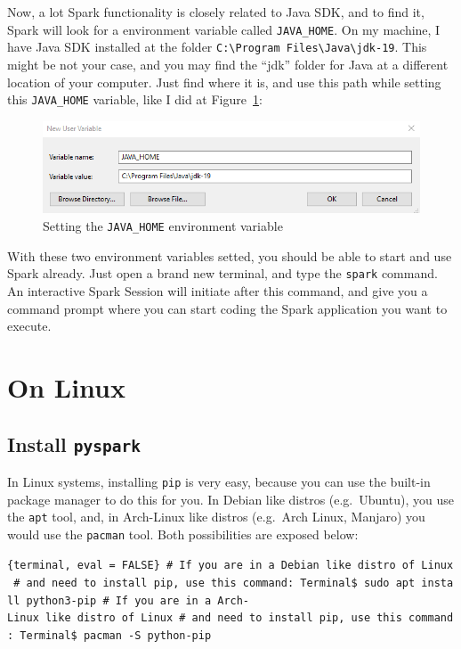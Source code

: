 \documentclass[
  11pt,
  letterpaper,
  DIV=11,
  numbers=noendperiod]{scrreprt}
\begin{document}
Now, a lot Spark functionality is closely related to Java SDK, and to
find it, Spark will look for a environment variable called
\texttt{JAVA\_HOME}. On my machine, I have Java SDK installed at the
folder
\texttt{C:\textbackslash{}Program\ Files\textbackslash{}Java\textbackslash{}jdk-19}.
This might be not your case, and you may find the ``jdk'' folder for
Java at a different location of your computer. Just find where it is,
and use this path while setting this \texttt{JAVA\_HOME} variable, like
I did at Figure~\ref{fig-java-home-env}:

\begin{figure}

{\centering \includegraphics{Chapters/../Figures/windows-environment-variables5.png}

}

\caption{\label{fig-java-home-env}Setting the \texttt{JAVA\_HOME}
environment variable}

\end{figure}

With these two environment variables setted, you should be able to start
and use Spark already. Just open a brand new terminal, and type the
\texttt{spark} command. An interactive Spark Session will initiate after
this command, and give you a command prompt where you can start coding
the Spark application you want to execute.

\hypertarget{on-linux}{%
\section{On Linux}\label{on-linux}}

\hypertarget{install-pyspark-1}{%
\subsection{\texorpdfstring{Install
\texttt{pyspark}}{Install pyspark}}\label{install-pyspark-1}}

In Linux systems, installing \texttt{pip} is very easy, because you can
use the built-in package manager to do this for you. In Debian like
distros (e.g.~Ubuntu), you use the \texttt{apt} tool, and, in Arch-Linux
like distros (e.g.~Arch Linux, Manjaro) you would use the
\texttt{pacman} tool. Both possibilities are exposed below:

\texttt{\{terminal,\ eval\ =\ FALSE\}\ \#\ If\ you\ are\ in\ a\ Debian\ like\ distro\ of\ Linux\ \#\ and\ need\ to\ install\ \textasciigrave{}pip\textasciigrave{},\ use\ this\ command:\ Terminal\$\ sudo\ apt\ install\ python3-pip\ \#\ If\ you\ are\ in\ a\ Arch-Linux\ like\ distro\ of\ Linux\ \#\ and\ need\ to\ install\ \textasciigrave{}pip\textasciigrave{},\ use\ this\ command:\ Terminal\$\ pacman\ -S\ python-pip}
\end{document}
